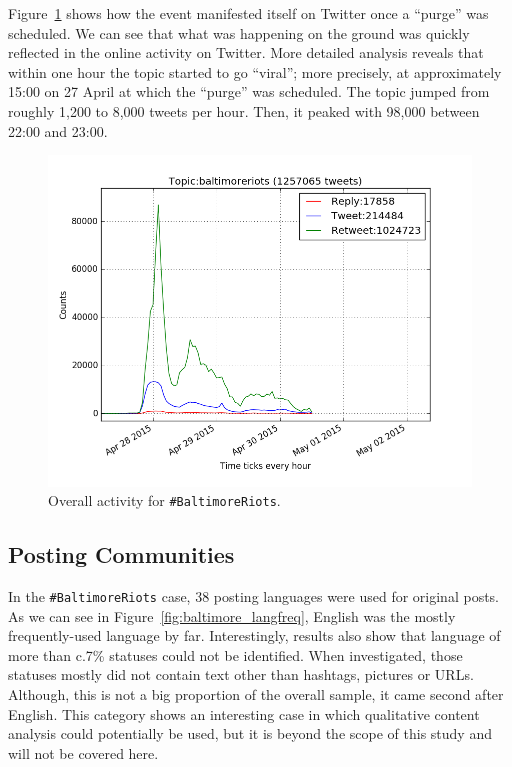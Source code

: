 \documentclass{llncs}
\begin{document}
Figure~\ref{fig:overallbaltimoreactivity} shows how the event
manifested itself on Twitter once a ``purge'' was scheduled. We can
see that what was happening on the ground was quickly reflected in the
online activity on Twitter. More detailed analysis reveals that within
one hour the topic started to go ``viral''; more precisely, at
approximately 15:00 on 27 April at which the ``purge'' was
scheduled. The topic jumped from roughly 1,200 to 8,000 tweets per
hour. Then, it peaked with 98,000 between 22:00 and 23:00.

\begin{figure}[htb]
\centering
\includegraphics[width=\columnwidth]{images/overallbaltimoreactivity.png}
\caption{Overall activity for {\texttt{\#BaltimoreRiots}}.}
\label{fig:overallbaltimoreactivity}
\end{figure}

\subsection{Posting Communities}\label{baltimoreposting}

In the {\texttt{\#BaltimoreRiots}} case, 38 posting languages were
used for original posts. As we can see in
Figure~\ref{fig:baltimore_langfreq}, English was the mostly
frequently-used language by far. Interestingly, results also show that
language of more than c.7\% statuses could not be identified. When
investigated, those statuses mostly did not contain text other than
hashtags, pictures or URLs. Although, this is not a big proportion of
the overall sample, it came second after English. This category shows
an interesting case in which qualitative content analysis could
potentially be used, but it is beyond the scope of this study and will
not be covered here.
\end{document}
